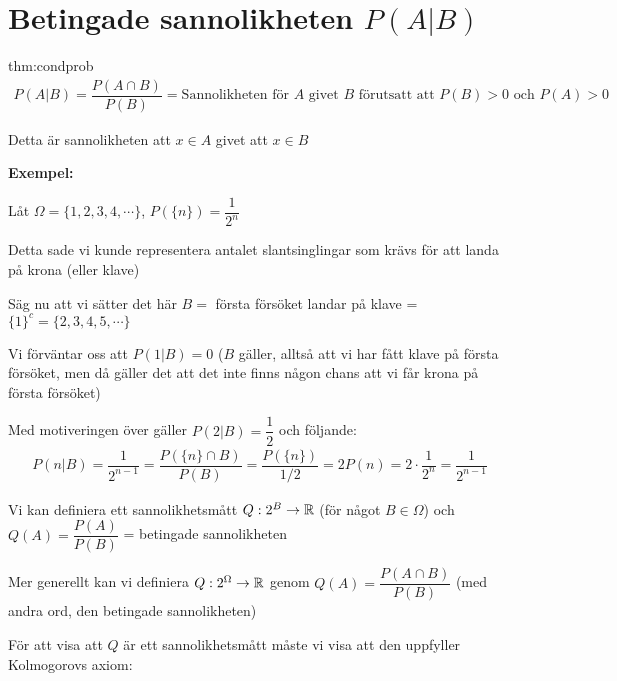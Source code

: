 \section{Betingade sannolikheten $P(A|B)$}
\par\bigskip
\begin{theo}{thm:condprob}
  \begin{equation*}
    \begin{gathered}
      P(A|B) = \dfrac{P(A\cap B)}{P(B)} = \text{Sannolikheten för $A$ givet $B$ förutsatt att $P(B)>0$ och $P(A)>0$}
    \end{gathered}
  \end{equation*}\par
  \noindent Detta är sannolikheten att $x\in A$ givet att $x\in B$
\end{theo}
\par\bigskip
\noindent\textbf{Exempel:}
\par\bigskip
\noindent Låt $\Omega = \{1,2,3,4,\cdots\}$, $P(\{n\})=\dfrac{1}{2^n}$
\par\bigskip
\noindent Detta sade vi kunde representera antalet slantsinglingar som krävs för att landa på krona (eller klave)\par
\noindent Säg nu att vi sätter det här $B = $ första försöket landar på klave = $\{1\}^c = \{2,3,4,5,\cdots\}$
\par\bigskip
\noindent Vi förväntar oss att $P(1|B) = 0$ ($B$ gäller, alltså att vi har fått klave på första försöket, men då gäller det att det inte finns någon chans att vi får krona på första försöket)
\par\bigskip
\noindent Med motiveringen över gäller $P(2|B) = \dfrac{1}{2}$ och följande:
\begin{equation*}
  \begin{gathered}
    P(n|B) = \dfrac{1}{2^{n-1}} =\dfrac{P(\{n\}\cap B)}{P(B)} = \dfrac{P(\{n\})}{1/2} = 2P(n)=2\cdot\dfrac{1}{2^n} = \dfrac{1}{2^{n-1}}
  \end{gathered}
\end{equation*}
\par\bigskip
\noindent Vi kan definiera ett sannolikhetsmått $Q:2^B\to\mathbb{R}$ (för något $B\in\Omega$) och $Q(A) = \dfrac{P(A)}{P(B)}$ = betingade sannolikheten\par
\noindent Mer generellt kan vi definiera $Q:2^\Omega\to\mathbb{R}$ genom $Q(A) = \dfrac{P(A\cap B)}{P(B)}$ (med andra ord, den betingade sannolikheten)
\par\bigskip
\noindent För att visa att $Q$ är ett sannolikhetsmått måste vi visa att den uppfyller Kolmogorovs axiom:
